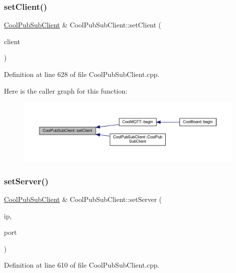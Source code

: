 \subsubsection{\texorpdfstring{set\+Client()}{setClient()}}
{\footnotesize\ttfamily \hyperlink{class_cool_pub_sub_client}{Cool\+Pub\+Sub\+Client} \& Cool\+Pub\+Sub\+Client\+::set\+Client (\begin{DoxyParamCaption}\item[{Client \&}]{client }\end{DoxyParamCaption})}



Definition at line 628 of file Cool\+Pub\+Sub\+Client.\+cpp.

Here is the caller graph for this function\+:
\nopagebreak
\begin{figure}[H]
\begin{center}
\leavevmode
\includegraphics[width=350pt]{class_cool_pub_sub_client_a7ee119b786010561ab6a9afa0798e91d_icgraph}
\end{center}
\end{figure}
\mbox{\label{class_cool_pub_sub_client_a947e70c394c66c7d08d0c53caf8425e3}} 
\subsubsection{\texorpdfstring{set\+Server()}{setServer()}\hspace{0.1cm}{\footnotesize\ttfamily [1/3]}}
{\footnotesize\ttfamily \hyperlink{class_cool_pub_sub_client}{Cool\+Pub\+Sub\+Client} \& Cool\+Pub\+Sub\+Client\+::set\+Server (\begin{DoxyParamCaption}\item[{I\+P\+Address}]{ip,  }\item[{uint16\+\_\+t}]{port }\end{DoxyParamCaption})}



Definition at line 610 of file Cool\+Pub\+Sub\+Client.\+cpp.

